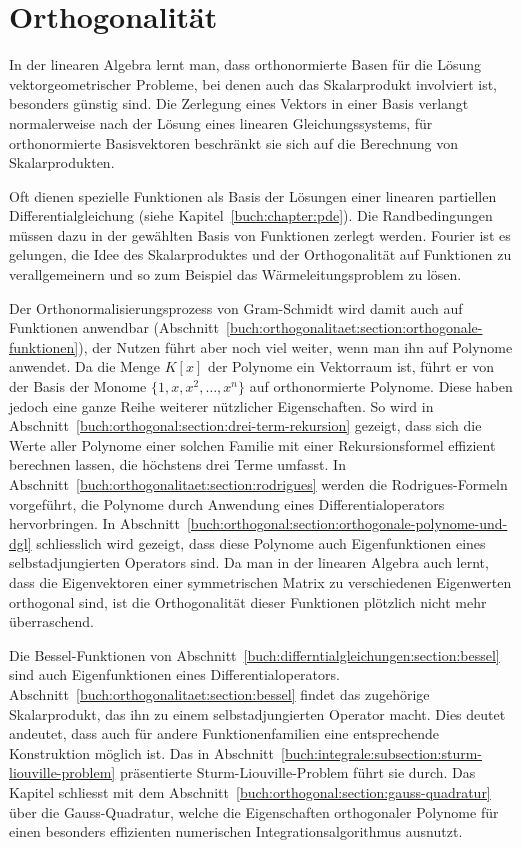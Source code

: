 %
%
%
\chapter{Orthogonalität
\label{buch:chapter:orthogonalitaet}}
\rhead{}
In der linearen Algebra lernt man, dass orthonormierte Basen für die
Lösung vektorgeometrischer Probleme, bei denen auch das Skalarprodukt
involviert ist, besonders günstig sind.
Die Zerlegung eines Vektors in einer Basis verlangt normalerweise nach
der Lösung eines linearen Gleichungssystems, für orthonormierte
Basisvektoren beschränkt sie sich auf die Berechnung von Skalarprodukten.

Oft dienen spezielle Funktionen als Basis der Lösungen einer linearen
partiellen Differentialgleichung (siehe Kapitel~\ref{buch:chapter:pde}).
Die Randbedingungen müssen dazu in der gewählten Basis von Funktionen
zerlegt werden.
Fourier ist es gelungen, die Idee des Skalarproduktes und der Orthogonalität
auf Funktionen zu verallgemeinern und so zum Beispiel das Wärmeleitungsproblem
zu lösen.

Der Orthonormalisierungsprozess von Gram-Schmidt wird damit auch auf
Funktionen anwendbar
(Abschnitt~\ref{buch:orthogonalitaet:section:orthogonale-funktionen}),
der Nutzen führt aber noch viel weiter,
wenn man ihn auf Polynome anwendet.
Da die Menge $K[x]$ der Polynome ein Vektorraum ist, führt er von der
Basis der Monome $\{1,x,x^2,\dots,x^n\}$ auf orthonormierte Polynome.
Diese haben jedoch eine ganze Reihe weiterer nützlicher Eigenschaften.
So wird in Abschnitt~\ref{buch:orthogonal:section:drei-term-rekursion}
gezeigt, dass sich die Werte aller Polynome einer solchen Familie mit
einer Rekursionsformel effizient berechnen lassen, die höchstens drei
Terme umfasst.
In Abschnitt~\ref{buch:orthogonalitaet:section:rodrigues} werden
die Rodrigues-Formeln vorgeführt, die Polynome durch Anwendung eines
Differentialoperators hervorbringen.
In Abschnitt~\ref{buch:orthogonal:section:orthogonale-polynome-und-dgl}
schliesslich wird gezeigt, dass diese Polynome auch Eigenfunktionen
eines selbstadjungierten Operators sind.
Da man in der linearen Algebra auch lernt, dass die Eigenvektoren einer
symmetrischen Matrix zu verschiedenen Eigenwerten orthogonal sind,
ist die Orthogonalität dieser Funktionen plötzlich nicht mehr überraschend.

Die Bessel-Funktionen von
Abschnitt~\ref{buch:differntialgleichungen:section:bessel}
sind auch Eigenfunktionen eines Differentialoperators.
Abschnitt~\ref{buch:orthogonalitaet:section:bessel} findet das zugehörige
Skalarprodukt, das ihn zu einem selbstadjungierten Operator macht.
Dies deutet andeutet, dass auch für andere Funktionenfamilien
eine entsprechende Konstruktion möglich ist.
Das in Abschnitt~\ref{buch:integrale:subsection:sturm-liouville-problem}
präsentierte Sturm-Liouville-Problem führt sie durch.
Das Kapitel schliesst mit dem
Abschnitt~\ref{buch:orthogonal:section:gauss-quadratur}
über die Gauss-Quadratur, welche die Eigenschaften orthogonaler Polynome
für einen besonders effizienten numerischen Integrationsalgorithmus
ausnutzt.

